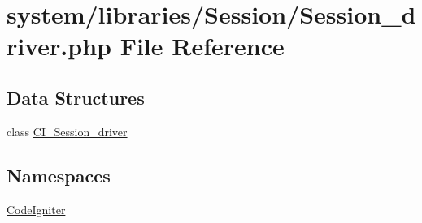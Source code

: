 \hypertarget{_session__driver_8php}{}\section{system/libraries/\+Session/\+Session\+\_\+driver.php File Reference}
\label{_session__driver_8php}
\subsection*{Data Structures}
\begin{DoxyCompactItemize}
\item 
class \mbox{\hyperlink{class_c_i___session__driver}{C\+I\+\_\+\+Session\+\_\+driver}}
\end{DoxyCompactItemize}
\subsection*{Namespaces}
\begin{DoxyCompactItemize}
\item 
 \mbox{\hyperlink{namespace_code_igniter}{Code\+Igniter}}
\end{DoxyCompactItemize}
